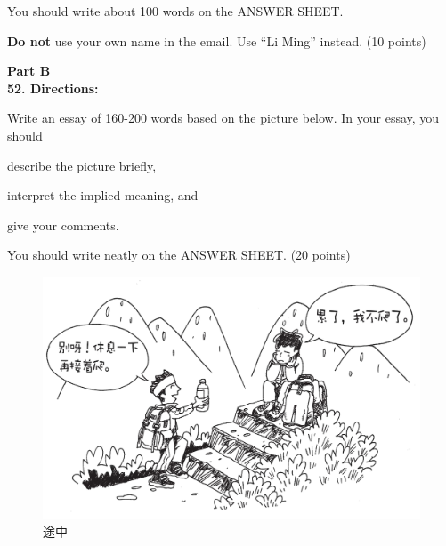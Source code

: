 You should write about 100 words on the
ANSWER SHEET. 

\textbf{Do not} use your own name in the email. Use ``Li Ming''
instead. (10 points)


\vspace{2em}

\noindent
\textbf{Part B}\\
\textbf{52. Directions:} 

Write an essay of 160-200 words based on the
picture below. In your essay, you should
\begin{listwrite}
	\item 
 describe the picture briefly,
\item 
interpret the implied meaning, and 
\item 
give your comments. 
\end{listwrite}

You should write neatly on the ANSWER SHEET. (20 points)


\begin{figure}[h!]
	\centering
	\includegraphics[width=0.58\linewidth]{picture/2019.png}
	\caption*{途中}
\end{figure}




\checkpagenumber